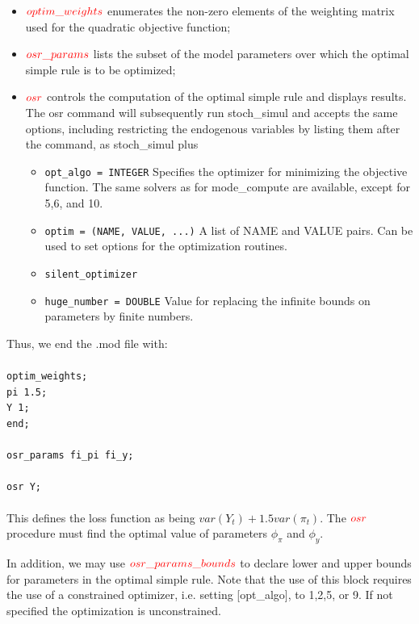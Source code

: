 \documentclass[cn,10pt,math=newtx,citestyle=gb7714-2015,bibstyle=gb7714-2015]{elegantbook}
\begin{document}
	\begin{itemize}
		\item $\textcolor{red}{optim\_weights}$ enumerates the non-zero elements of the weighting matrix used for the quadratic objective function;
		\item $\textcolor{red}{osr\_params}$ lists the subset of the model parameters over which the optimal simple rule is to be optimized;
		\item $\textcolor{red}{osr}$ controls the computation of the optimal simple rule and displays results.\\
		The osr command will subsequently run stoch\_simul and accepts the same options, including restricting the endogenous variables by listing them after the command, as stoch\_simul plus
		\begin{itemize}
			\item \texttt{opt\_algo = INTEGER} Specifies the optimizer for minimizing the objective function. The same solvers as for mode\_compute are available, except for 5,6, and 10.
			\item \texttt{optim = (NAME, VALUE, ...)} A list of NAME and VALUE pairs. Can be used to set options for the optimization routines.
			\item \texttt{silent\_optimizer}
			\item \texttt{huge\_number = DOUBLE} Value for replacing the infinite bounds on parameters by finite numbers.
		\end{itemize}
	\end{itemize}
	
	Thus, we end the .mod file with:\\
	\\
	\texttt{optim\_weights;\\
		pi 1.5;\\
		Y 1;\\
		end;\\
		\\
		osr\_params fi\_pi fi\_y;\\
		\\
		osr Y;}\\
	\\
	
	This defines the loss function as being $var(Y_t)+1.5var(\pi_t)$. The $\textcolor{red}{osr}$ procedure must find the optimal value of parameters $\phi_{\pi}$ and $\phi_{y}$.
	
	In addition, we may use $\textcolor{red}{osr\_params\_bounds}$ to declare lower and upper bounds for parameters in the optimal simple rule. Note that the use of this block requires the use of a constrained optimizer, i.e. setting [opt\_algo], to 1,2,5, or 9. If not specified the optimization is unconstrained.
	
\end{document}
